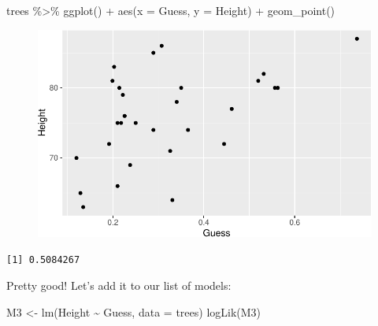 \documentclass[
  letterpaper,
  DIV=11,
  numbers=noendperiod]{scrreprt}
\newenvironment{Shaded}{\begin{snugshade}}{\end{snugshade}}
\newcommand{\AttributeTok}[1]{\textcolor[rgb]{0.40,0.45,0.13}{#1}}
\newcommand{\FunctionTok}[1]{\textcolor[rgb]{0.28,0.35,0.67}{#1}}
\newcommand{\NormalTok}[1]{\textcolor[rgb]{0.00,0.23,0.31}{#1}}
\newcommand{\OtherTok}[1]{\textcolor[rgb]{0.00,0.23,0.31}{#1}}
\newcommand{\SpecialCharTok}[1]{\textcolor[rgb]{0.37,0.37,0.37}{#1}}
\begin{document}
\begin{Shaded}
\begin{Highlighting}[]
\NormalTok{trees }\SpecialCharTok{\%\textgreater{}\%} \FunctionTok{ggplot}\NormalTok{() }\SpecialCharTok{+} \FunctionTok{aes}\NormalTok{(}\AttributeTok{x =}\NormalTok{ Guess, }\AttributeTok{y =}\NormalTok{ Height) }\SpecialCharTok{+} \FunctionTok{geom\_point}\NormalTok{()}
\end{Highlighting}
\end{Shaded}

\begin{figure}[H]

{\centering \includegraphics{./10-model_selection_files/figure-pdf/unnamed-chunk-16-1.pdf}

}

\end{figure}

\begin{Shaded}
\end{Shaded}

\begin{verbatim}
[1] 0.5084267
\end{verbatim}

Pretty good! Let's add it to our list of models:

\begin{Shaded}
\begin{Highlighting}[]
\NormalTok{M3 }\OtherTok{\textless{}{-}} \FunctionTok{lm}\NormalTok{(Height }\SpecialCharTok{\textasciitilde{}}\NormalTok{ Guess, }\AttributeTok{data =}\NormalTok{ trees)}
\FunctionTok{logLik}\NormalTok{(M3)}
\end{Highlighting}
\end{Shaded}
\end{document}
